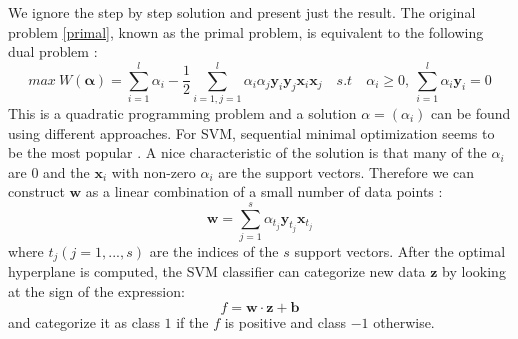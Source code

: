\documentclass[a4paper,11pt,oneside]{article}
\begin{document}
We ignore the step by step solution and present just the result. The original problem \ref{primal}, known as the primal problem,
is equivalent to the following dual problem \cite{law2006simple}:
\begin{equation}
  max \ W(\mathbf{\alpha}) = \sum_{i=1}^l \alpha_i - \frac{1}{2} \sum_{i=1,j=1}^l \alpha_i \alpha_j \mathbf{y}_i\mathbf{y}_j\mathbf{x}_i\mathbf{x}_j
  \quad s.t \quad \alpha_i \geq 0,\ \sum_{i=1}^l \alpha_i\mathbf{y}_i = 0
\end{equation}
This is a quadratic programming problem and a solution $\alpha=(\alpha_i)$ can be found using different approaches.
For SVM, sequential minimal optimization seems to be the most popular \cite{law2006simple}. A nice characteristic 
of the solution is that many of the $\alpha_i$ are $0$ and the $\mathbf{x}_i$ with non-zero $\alpha_i$ are the support 
vectors. Therefore we can construct $\mathbf{w}$ as a linear combination of a small number of data points \cite{law2006simple}:
\begin{equation}\label{svm4}
  \mathbf{w} = \sum_{j=1}^s \alpha_{t_j}\mathbf{y}_{t_j}\mathbf{x}_{t_j}
\end{equation}
where $t_j(j=1,...,s)$ are the indices of the $s$ support vectors.
After the optimal hyperplane is computed, the SVM classifier can categorize new data $\mathbf{z}$ by looking at the sign of the expression:
\begin{equation}
  f = \mathbf{w}\cdot\mathbf{z}+\mathbf{b}
\end{equation} and categorize it as class $1$ if the $f$ is positive and class $-1$ otherwise.
\end{document}
